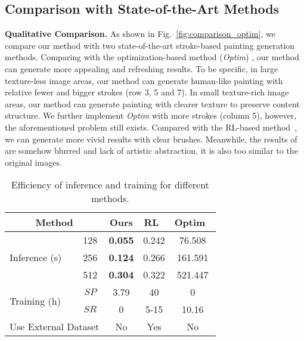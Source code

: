 \documentclass[10pt,twocolumn,letterpaper]{article}
\begin{document}
\subsection{Comparison with State-of-the-Art Methods}

\noindent
\textbf{Qualitative Comparison.}
As shown in Fig.~\ref{fig:comparison_optim}, we compare our method with two state-of-the-art stroke-based painting generation methods.
Comparing with the optimization-based method (\emph{Optim}) \cite{zou2020stylized}, our method can generate more appealing and refreshing results. To be specific, in large texture-less image areas, our method can generate human-like painting with relative fewer and bigger strokes (row 3, 5 and 7). In small texture-rich image areas, our method can generate painting with clearer texture to preserve content structure. We further implement \emph{Optim} with more strokes (column 5), however, the aforementioned problem still exists.
Compared with the RL-based method~\cite{huang2019learning}, we can generate more vivid results with clear brushes. Meanwhile, the results of \cite{huang2019learning} are somehow blurred and lack of artistic abstraction, it is also too similar to the original images. 

\begin{table}[!t]
\centering
    \begin{tabular}{lcccc}
        \toprule
        \multicolumn{2}{c}{Method} & Ours & RL~\cite{huang2019learning} & Optim~\cite{zou2020stylized} \\
        \midrule
        \multirow{3}{2cm}{Inference (s)} & 128 & \textbf{0.055} & 0.242 & 76.508 \\
        \cline{2-5}
        & 256 & \textbf{0.124} & 0.266 & 161.591 \\
        \cline{2-5}
        & 512 & \textbf{0.304} & 0.322 & 521.447 \\
        \hline
        \multirow{2}{2cm}{Training (h)} & $SP$ & 3.79 & 40 & 0 \\
        \cline{2-5}
        & $SR$ & 0 & 5-15 & 10.16 \\
        \hline
        \multicolumn{2}{c}{Use External Dataset} & No & Yes & No \\
        \bottomrule
    \end{tabular}
    \vspace{0.3cm}
    \caption{Efficiency of inference and training for different methods.}
    \label{table:efficiency}
    \vspace{-0.2cm}
\end{table}
\end{document}
